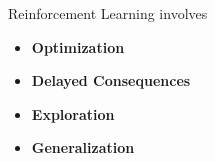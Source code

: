 \documentclass[aspectratio=169,handout]{beamer}
\begin{document}
%	
%	
%	
%	

\begin{frame}{Reinforcement Learning involves}
\begin{itemize}
	\item {\textbf<2-2>{Optimization}}
	\item {\textbf<3-3>{Delayed Consequences}}
	\item {\textbf<4-4>{Exploration}}
	\item {\textbf<5-5>{Generalization}}
\end{itemize}
\end{frame}
\end{document}
